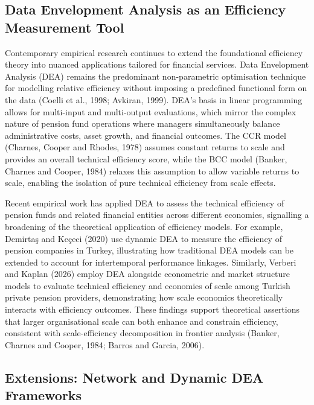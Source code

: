 \documentclass[12pt,a4paper]{article}
\begin{document}
\subsection{Data Envelopment Analysis as an Efficiency Measurement Tool}

Contemporary empirical research continues to extend the foundational efficiency theory into nuanced applications tailored for financial services. Data Envelopment Analysis (DEA) remains the predominant non-parametric optimisation technique for modelling relative efficiency without imposing a predefined functional form on the data (Coelli et al., 1998; Avkiran, 1999). DEA's basis in linear programming allows for multi-input and multi-output evaluations, which mirror the complex nature of pension fund operations where managers simultaneously balance administrative costs, asset growth, and financial outcomes. The CCR model (Charnes, Cooper and Rhodes, 1978) assumes constant returns to scale and provides an overall technical efficiency score, while the BCC model (Banker, Charnes and Cooper, 1984) relaxes this assumption to allow variable returns to scale, enabling the isolation of pure technical efficiency from scale effects.

Recent empirical work has applied DEA to assess the technical efficiency of pension funds and related financial entities across different economies, signalling a broadening of the theoretical application of efficiency models. For example, Demirta\c{s} and Ke\c{c}eci (2020) use dynamic DEA to measure the efficiency of pension companies in Turkey, illustrating how traditional DEA models can be extended to account for intertemporal performance linkages. Similarly, Verberi and Kaplan (2026) employ DEA alongside econometric and market structure models to evaluate technical efficiency and economies of scale among Turkish private pension providers, demonstrating how scale economics theoretically interacts with efficiency outcomes. These findings support theoretical assertions that larger organisational scale can both enhance and constrain efficiency, consistent with scale-efficiency decomposition in frontier analysis (Banker, Charnes and Cooper, 1984; Barros and Garcia, 2006).

\subsection{Extensions: Network and Dynamic DEA Frameworks}
\end{document}
